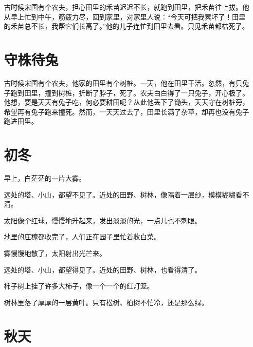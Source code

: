 \documentclass[12pt,UTF-8,openany]{ctexbook}
\begin{document}
\begin{Large}
    
    古时候宋国有个农夫，担心田里的禾苗迟迟不长，就跑到田里，把禾苗往上拔。他从早上忙到中午，筋疲力尽，回到家里，对家里人说：“今天可把我累坏了！田里的禾苗总不长，我帮它们长高了。”他的儿子连忙到田里去看。只见禾苗都枯死了。
    
\end{Large}

\chapter{守株待兔}

\begin{Large}
    
    古时候宋国有个农夫，他家的田里有个树桩。一天，他在田里干活。忽然，有只兔子跑到田里，撞到树桩，折断了脖子，死了。农夫白白得了一只兔子，开心极了。他想，要是天天有兔子吃，何必要耕田呢？从此他丢下了锄头，天天守在树桩旁，希望再有兔子跑来撞死。然而，一天天过去了，田里长满了杂草，却再也没有兔子跑进田里。
    
\end{Large}

\chapter{初冬}

\begin{Large}
    
    早上，白茫茫的一片大雾。
    
    远处的塔、小山，都望不见了。近处的田野、树林，像隔着一层纱，模模糊糊看不清。
    
    太阳像个红球，慢慢地升起来，发出淡淡的光，一点儿也不刺眼。
    
    地里的庄稼都收完了，人们正在园子里忙着收白菜。
    
    雾慢慢地散了，太阳射出光芒来。
    
    远处的塔、小山，都望得见了。近处的田野、树林，也看得清了。
    
    柿子树上挂了许多大柿子，像一个一个的红灯笼。
    
    树林里落了厚厚的一层黄叶。只有松树、柏树不怕冷，还是那么绿。
    
\end{Large}

\chapter{秋天}
\end{document}
